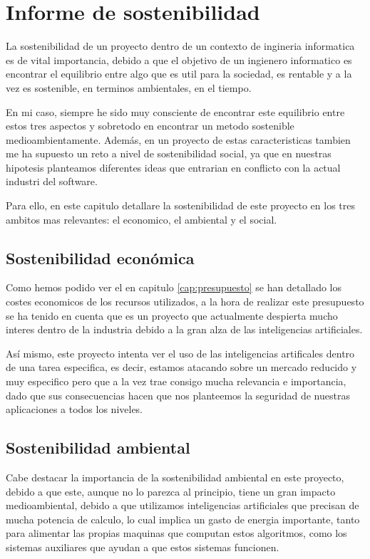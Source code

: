 \chapter{Informe de sostenibilidad}
\label{cap:sostenibilidad}

La sostenibilidad de un proyecto dentro de un contexto de ingineria informatica es de vital importancia, debido a que el objetivo de un ingienero informatico 
es encontrar el equilibrio entre algo que es util para la sociedad, es rentable y a la vez es sostenible, en terminos ambientales, en el tiempo.

En mi caso, siempre he sido muy consciente de encontrar este equilibrio entre estos tres aspectos y sobretodo en encontrar un metodo sostenible medioambientamente. Además, en
un proyecto de estas caracteristicas tambien me ha supuesto un reto a nivel de sostenibilidad social, ya que en nuestras hipotesis planteamos diferentes
ideas que entrarian en conflicto con la actual industri del software.

Para ello, en este capitulo detallare la sostenibilidad de este proyecto en los tres ambitos mas relevantes: el economico, el ambiental y el social.

\section{Sostenibilidad económica}
\label{sec:sostenibilidad_economica}

Como hemos podido ver el en capitulo \ref{cap:presupuesto} se han detallado los costes economicos de los recursos utilizados, a la hora de realizar este presupuesto se ha tenido
en cuenta que es un proyecto que actualmente despierta mucho interes dentro de la industria debido a la gran alza de las inteligencias artificiales.

Así mismo, este proyecto intenta ver el uso de las inteligencias artificales dentro de una tarea especifica, es decir, estamos atacando sobre un mercado reducido y muy especifico
pero que a la vez trae consigo mucha relevancia e importancia, dado que sus consecuencias hacen que nos planteemos la seguridad de nuestras aplicaciones a todos los niveles.

\section{Sostenibilidad ambiental}
\label{sec:sostenibilidad_ambiental}

Cabe destacar la importancia de la sostenibilidad ambiental en este proyecto, debido a que este, aunque no lo parezca al principio, tiene un gran impacto medioambiental, debido
a que utilizamos inteligencias artificiales que precisan de mucha potencia de calculo, lo cual implica un gasto de energia importante, tanto para alimentar las propias maquinas
que computan estos algoritmos, como los sistemas auxiliares que ayudan a que estos sistemas funcionen.

